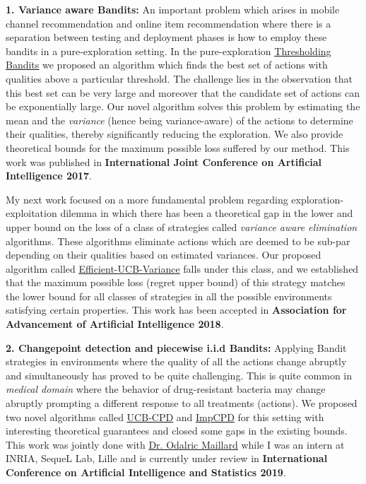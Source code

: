 \documentclass{article}
\begin{document}
\textbf{1. Variance aware Bandits:} An important problem which arises in mobile channel recommendation and online item recommendation where there is a separation between testing and deployment phases is how to employ these bandits in a pure-exploration setting. In the pure-exploration \href{https://www.ijcai.org/proceedings/2017/0350.pdf}{\underline{\color{blue}Thresholding Bandits}} \citep{mukherjee2016} we proposed an algorithm which finds the best set of actions with qualities above a particular threshold. The challenge lies in the observation that this best set can be very large and moreover that the candidate set of actions can be exponentially large. Our novel algorithm solves this problem by estimating the mean and the \textit{variance} (hence being variance-aware) of the actions to determine their qualities, thereby significantly reducing the exploration. We also provide theoretical bounds for the maximum possible loss suffered by our
method. This work was published in \textbf{International Joint Conference on Artificial Intelligence 2017}.


My next work focused on a more fundamental problem regarding exploration-exploitation dilemma in which there has been a theoretical gap in the lower and upper bound on the loss of a class of strategies called \textit{variance aware elimination} algorithms. These algorithms eliminate actions which are deemed to be sub-par depending on their qualities based on estimated variances. Our proposed algorithm called \href{https://www.aaai.org/ocs/index.php/AAAI/AAAI18/paper/view/16111}{\underline{\color{blue}Efficient-UCB-Variance}} \citep{mukherjee2018} falls under this class, and we established that the maximum possible loss (regret upper bound) of this strategy matches the lower bound for all classes of strategies in all the possible environments satisfying certain properties. This work has been accepted in \textbf{Association for Advancement of Artificial Intelligence 2018}.

\textbf{2. Changepoint detection and piecewise i.i.d Bandits:}  Applying Bandit strategies in environments where the quality of all the actions change abruptly and simultaneously has proved to be quite challenging. This is quite common in \textit{medical domain} where the behavior of drug-resistant bacteria may change abruptly prompting a different response to all treatments (actions). We proposed two novel algorithms called \href{https://subhojyoti.github.io/pdf/aistats_2019.pdf}{\underline{\color{blue}UCB-CPD}} and \href{https://subhojyoti.github.io/pdf/aistats_2019.pdf}{\underline{\color{blue}ImpCPD}} for this setting with interesting theoretical guarantees and closed some gaps in the existing bounds. This work was jointly done with \href{https://scholar.google.com/citations?user=7EweMdoAAAAJ&hl=en}{\underline{\color{red}Dr. Odalric Maillard}} while I was an intern at INRIA, SequeL Lab, Lille and is currently under review in \textbf{International Conference on Artificial Intelligence and Statistics 2019}. 
\end{document}
